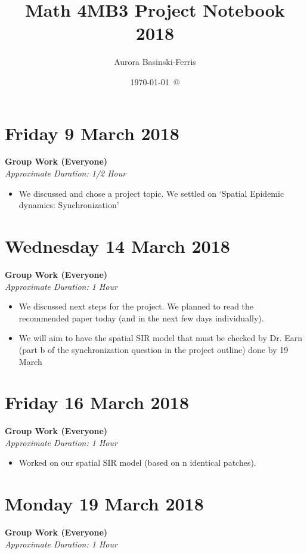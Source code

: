\documentclass[12pt]{article}\usepackage[]{graphicx}\usepackage[]{color}
\title{Math 4MB3 Project Notebook 2018}
\author{Aurora Basinski-Ferris}
\date{\today\ @ \thistime}
\begin{document}
\maketitle

\section*{Friday 9 March 2018}

\textbf{Group Work (Everyone)} \\
\emph{Approximate Duration: 1/2 Hour}

\begin{itemize}
\item We discussed and chose a project topic. We settled on `Spatial Epidemic dynamics: Synchronization'
\end{itemize}

\section*{Wednesday 14 March 2018}

\textbf{Group Work (Everyone)} \\
\emph{Approximate Duration: 1 Hour}

\begin{itemize}
\item We discussed next steps for the project. We planned to read the recommended paper today (and in the next few days individually). 
\item We will aim to have the spatial SIR model that must be checked by Dr. Earn (part b of the synchronization question in the project outline) done by 19 March
\end{itemize}

\section*{Friday 16 March 2018}
\textbf{Group Work (Everyone)} \\
\emph{Approximate Duration: 1 Hour}

\begin{itemize}
\item Worked on our spatial SIR model (based on n identical patches).
\end{itemize}

\section*{Monday 19 March 2018}
\textbf{Group Work (Everyone)} \\
\emph{Approximate Duration: 1 Hour}
\end{document}
